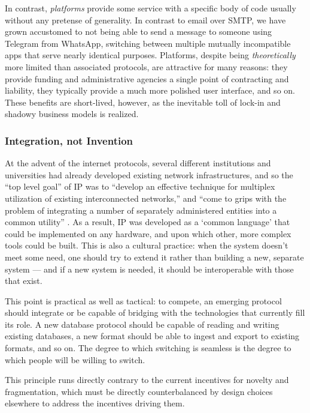 \documentclass[10pt]{article}
\begin{document}
\begin{multicols}{2}
In contrast, \emph{platforms} provide some service with a specific body
of code usually without any pretense of generality. In contrast to email
over SMTP, we have grown accustomed to not being able to send a message
to someone using Telegram from WhatsApp, switching between multiple
mutually incompatible apps that serve nearly identical purposes.
Platforms, despite being \emph{theoretically} more limited than
associated protocols, are attractive for many reasons: they provide
funding and administrative agencies a single point of contracting and
liability, they typically provide a much more polished user interface,
and so on. These benefits are short-lived, however, as the inevitable
toll of lock-in and shadowy business models is realized.

\hypertarget{integration-not-invention}{%
\subsubsection{Integration, not
Invention}\label{integration-not-invention}}

At the advent of the internet protocols, several different institutions
and universities had already developed existing network infrastructures,
and so the ``top level goal'' of IP was to ``develop an effective
technique for multiplex utilization of existing interconnected
networks,'' and ``come to grips with the problem of integrating a number
of separately administered entities into a common utility'' \cite{clarkDesignPhilosophyDARPA1988} . As a result, IP was developed as a
`common language' that could be implemented on any hardware, and upon
which other, more complex tools could be built. This is also a cultural
practice: when the system doesn't meet some need, one should try to
extend it rather than building a new, separate system --- and if a new
system is needed, it should be interoperable with those that exist.

This point is practical as well as tactical: to compete, an emerging
protocol should integrate or be capable of bridging with the
technologies that currently fill its role. A new database protocol
should be capable of reading and writing existing databases, a new
format should be able to ingest and export to existing formats, and so
on. The degree to which switching is seamless is the degree to which
people will be willing to switch.

This principle runs directly contrary to the current incentives for
novelty and fragmentation, which must be directly counterbalanced by
design choices elsewhere to address the incentives driving them.


\end{multicols}
\end{document}
